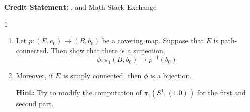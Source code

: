 \documentclass[12pt]{article}
\begin{document}


\textbf{Credit Statement:} \tism, and Math Stack Exchange


\begin{problem} {1}
    \begin{enumerate}
        \item [(a)] Let $p: (E, e_0) \to (B, b_0)$ be a covering map. Suppose that $E$ is path-connected. Then show that there is a surjection, 
        \[\phi: \pi_1(B,b_0) \to p^{-1}(b_0)\]
        \item [(b)] Moreover, if $E$ is simply connected, then $\phi$ is a bijection. 
        
        \textbf{Hint:} Try to modify the computation of $\pi_1(S^1, (1.0))$ for the first and second part.
    \end{enumerate}
\end{problem}
\end{document}

